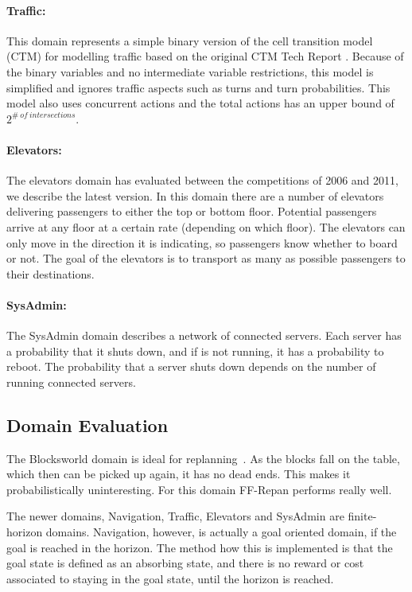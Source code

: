 \documentclass[runningheads,a4paper]{llncs}
\begin{document}
\paragraph{Traffic:}
This domain represents a simple binary version of the cell transition model
(CTM) for modelling traffic based on the original CTM Tech Report
\cite{sanner2011traffic}. Because of the binary variables and no intermediate
variable restrictions, this model is simplified and ignores traffic aspects
such as turns and turn probabilities. This model also uses concurrent actions
and the total actions has an upper bound of $2^{\#~of~intersections}$.

\paragraph{Elevators:}
The elevators domain has evaluated between the competitions of 2006 and
2011, we describe the latest version. In this domain there are a number of
elevators delivering passengers to either the top or bottom floor. Potential
passengers arrive at any floor at a certain rate (depending on which floor).
The elevators can only move in the direction it is indicating, so passengers
know whether to board or not. The goal of the elevators is to transport as many
as possible passengers to their destinations.

\paragraph{SysAdmin:}
The SysAdmin domain describes a network of connected servers. Each server has
a probability that it shuts down, and if is not running, it has a probability
to reboot. The probability that a server shuts down depends on the number of
running connected servers.

\subsection{Domain Evaluation}

The Blocksworld domain is ideal for
replanning~\cite{FFReplan, little2007probvsreplan}. As the blocks fall on the
table, which then can be picked up again, it has no dead ends. This makes it
probabilistically uninteresting. For this domain FF-Repan performs really well.

The newer  domains, Navigation, Traffic, Elevators and SysAdmin are finite-
horizon domains. Navigation, however, is actually a goal oriented domain, if
the goal is reached in the horizon. The method how this is implemented is that
the goal state is defined as an absorbing state, and there is no reward or cost
associated to staying in the goal state, until the horizon is reached.
\end{document}
